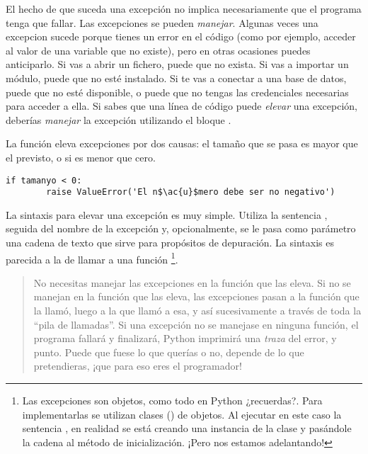 El hecho de que suceda una excepción no implica necesariamente que el programa tenga que fallar. Las excepciones se pueden \emph{manejar}. Algunas veces una excepcion sucede porque tienes un error en el código (como por ejemplo, acceder al valor de una variable que no existe), pero en otras ocasiones puedes anticiparlo. Si vas a abrir un fichero, puede que no exista. Si vas a importar un módulo, puede que no esté instalado. Si te vas a conectar a una base de datos, puede que no esté disponible, o puede que no tengas las credenciales necesarias para acceder a ella. Si sabes que una línea de código puede \emph{elevar} una excepción, deberías \emph{manejar} la excepción utilizando el bloque .

La función  eleva excepciones por dos causas: el tamaño que se pasa es mayor que el previsto, o si es menor que cero.

\noindent\begin{minipage}{\textwidth}
\begin{lstlisting}[mathescape=True]
    if tamanyo < 0:
        raise ValueError('El n$\ac{u}$mero debe ser no negativo')
\end{lstlisting}
\end{minipage}

La sintaxis para elevar una excepción es muy simple. Utiliza la sentencia , seguida del nombre de la excepción y, opcionalmente, se le pasa como parámetro una cadena de texto que sirve para propósitos de depuración. La sintaxis es parecida a la de llamar a una función \footnote{Las excepciones son objetos, como todo en Python ¿recuerdas?. Para implementarlas se utilizan clases () de objetos. Al ejecutar en este caso la sentencia , en realidad se está creando una instancia de la clase  y pasándole la cadena  al método de inicialización. ¡Pero nos estamos adelantando!}.

\begin{quote}
No necesitas manejar las excepciones en la función que las eleva. Si no se manejan en la función que las eleva, las excepciones pasan a la función que la llamó, luego a la que llamó a esa, y así sucesivamente a través de toda la ``pila de llamadas''. Si una excepción no se manejase en ninguna función, el programa fallará y finalizará, Python imprimirá una \emph{traza} del error, y punto. Puede que fuese lo que querías o no, depende de lo que pretendieras, ¡que para eso eres el programador!
\end{quote}


